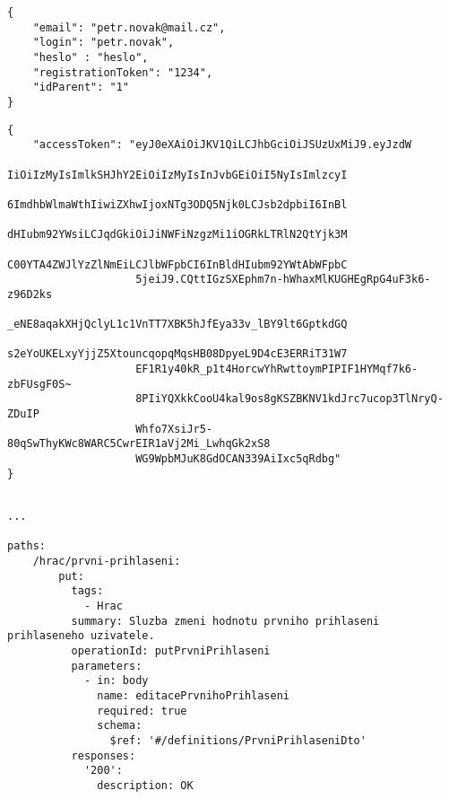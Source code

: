 \documentclass[twoside, 12pt]{article}
\begin{document}
{{\begin{lstlisting}
\end{lstlisting}

\clearpage


\vspace{10}



\vspace{10}


\begin{lstlisting}
{
    "email": "petr.novak@mail.cz",
    "login": "petr.novak",
    "heslo" : "heslo",
    "registrationToken": "1234",
    "idParent": "1"
}
\end{lstlisting}

\vspace{10}


\begin{lstlisting}
{
    "accessToken": "eyJ0eXAiOiJKV1QiLCJhbGciOiJSUzUxMiJ9.eyJzdW
                    IiOiIzMyIsImlkSHJhY2EiOiIzMyIsInJvbGEiOiI5NyIsImlzcyI
                    6ImdhbWlmaWthIiwiZXhwIjoxNTg3ODQ5Njk0LCJsb2dpbiI6InBl
                    dHIubm92YWsiLCJqdGkiOiJiNWFiNzgzMi1iOGRkLTRlN2QtYjk3M
                    C00YTA4ZWJlYzZlNmEiLCJlbWFpbCI6InBldHIubm92YWtAbWFpbC
                    5jeiJ9.CQttIGzSXEphm7n-hWhaxMlKUGHEgRpG4uF3k6-z96D2ks
                    _eNE8aqakXHjQclyL1c1VnTT7XBK5hJfEya33v_lBY9lt6GptkdGQ
                    s2eYoUKELxyYjjZ5XtouncqopqMqsHB08DpyeL9D4cE3ERRiT31W7
                    EF1R1y40kR_p1t4HorcwYhRwttoymPIPIF1HYMqf7k6-zbFUsgF0S~
                    8PIiYQXkkCooU4kal9os8gKSZBKNV1kdJrc7ucop3TlNryQ-ZDuIP
                    Whfo7XsiJr5-80qSwThyKWc8WARC5CwrEIR1aVj2Mi_LwhqGk2xS8
                    WG9WpbMJuK8GdOCAN339AiIxc5qRdbg"
}
\end{lstlisting}



\begin{lstlisting}

...

paths:
    /hrac/prvni-prihlaseni:
        put:
          tags:
            - Hrac
          summary: Sluzba zmeni hodnotu prvniho prihlaseni prihlaseneho uzivatele.
          operationId: putPrvniPrihlaseni
          parameters:
            - in: body
              name: editacePrvnihoPrihlaseni
              required: true
              schema:
                $ref: '#/definitions/PrvniPrihlaseniDto'
          responses:
            '200':
              description: OK


\end{lstlisting}}}
\end{document}
